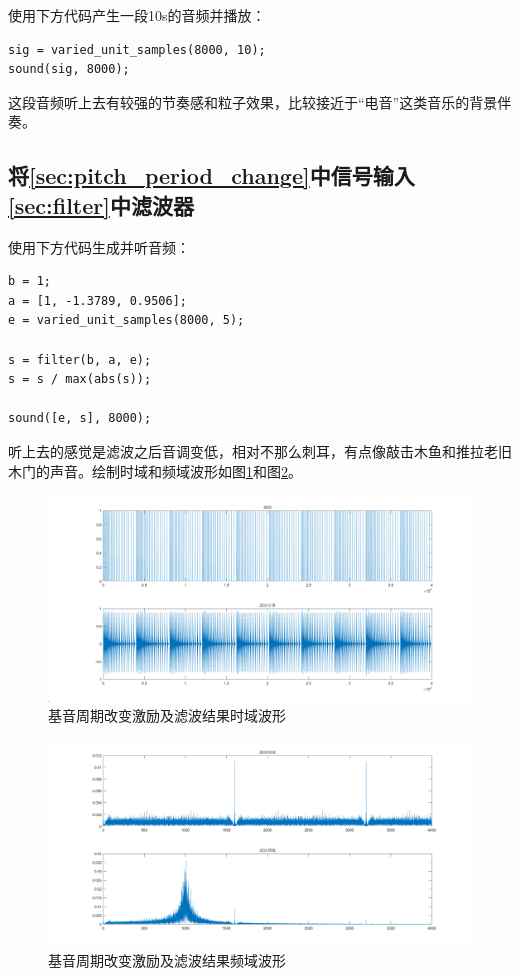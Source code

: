 \documentclass[10pt, a4paper]{article}
\begin{document}
使用下方代码产生一段10s的音频并播放：

\begin{verbatim}
sig = varied_unit_samples(8000, 10);
sound(sig, 8000);
\end{verbatim}

这段音频听上去有较强的节奏感和粒子效果，比较接近于“电音”这类音乐的背景伴奏。

\subsection{将\ref{sec:pitch_period_change}中信号输入\ref{sec:filter}中滤波器}

使用下方代码生成并听音频：

\begin{verbatim}
b = 1;
a = [1, -1.3789, 0.9506];
e = varied_unit_samples(8000, 5);

s = filter(b, a, e);
s = s / max(abs(s));

sound([e, s], 8000);
\end{verbatim}

听上去的感觉是滤波之后音调变低，相对不那么刺耳，有点像敲击木鱼和推拉老旧木门的声音。绘制时域和频域波形如图\ref{fig:2_3_time}和图\ref{fig:2_3_freq}。

\begin{figure}[h]
    \centering
    \includegraphics[width=.8\textwidth]{../assets/2_3_time.png}
    \caption{基音周期改变激励及滤波结果时域波形}
    \label{fig:2_3_time}
\end{figure}

\begin{figure}[h]
    \centering
    \includegraphics[width=.8\textwidth]{../assets/2_3_freq.png}
    \caption{基音周期改变激励及滤波结果频域波形}
    \label{fig:2_3_freq}
\end{figure}
\end{document}

